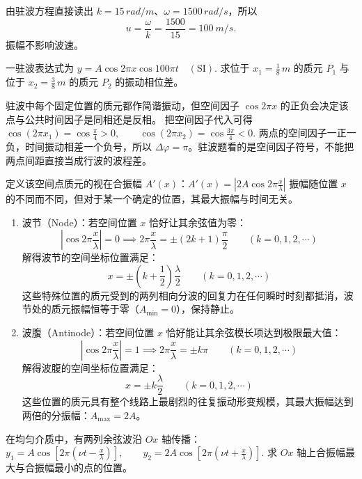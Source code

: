 \begin{solution}
由驻波方程直接读出 \(k=15\,\si{rad/m}\)、\(\omega=1500\,\si{rad/s}\)，所以
\[
u=\frac{\omega}{k}=\frac{1500}{15}=\SI{100}{m/s}.
\]
振幅不影响波速。
\end{solution}

\begin{exercise}
一驻波表达式为
 \(y=A\cos 2\pi x\cos 100\pi t\quad(\mathrm{SI}).\) 
求位于 \(x_1=\frac18\,\si{m}\) 的质元 \(P_1\) 与位于 \(x_2=\frac38\,\si{m}\) 的质元 \(P_2\) 的振动相位差。
\end{exercise}

\begin{solution}
驻波中每个固定位置的质元都作简谐振动，但空间因子 \(\cos 2\pi x\) 的正负会决定该点与公共时间因子是同相还是反相。
把空间因子代入可得
 \(\cos(2\pi x_1)=\cos\frac{\pi}{4}>0,\qquad \cos(2\pi x_2)=\cos\frac{3\pi}{4}<0.\) 
两点的空间因子一正一负，时间振动相差一个负号，所以 \(\Delta\varphi=\pi\)。驻波题看的是空间因子符号，不能把两点间距直接当成行波的波程差。
\end{solution}

\begin{definition}[波节，波腹]
定义该空间点质元的视在合振幅 $A'(x)$：$A'(x) = \left| 2A \cos 2\pi \frac{x}{\lambda} \right|$
振幅随位置 $x$ 的不同而不同，但对于某一个确定的位置，其最大振幅与时间无关。
\begin{enumerate}
\item 波节（Node）：若空间位置 $x$ 恰好让其余弦值为零：$$\left| \cos 2\pi \frac{x}{\lambda} \right| = 0 \implies 2\pi \frac{x}{\lambda} = \pm (2k + 1)\frac{\pi}{2} \qquad (k = 0,1,2,\cdots)$$解得波节的空间坐标位置满足：$$\boxed{x = \pm \left( k + \frac{1}{2} \right) \frac{\lambda}{2} \qquad (k = 0,1,2,\cdots)}$$这些特殊位置的质元受到的两列相向分波的回复力在任何瞬时时刻都抵消，波节处的质元振幅恒等于零（$A_{\text{min}} = 0$），保持静止。
\item 波腹（Antinode）：若空间位置 $x$ 恰好能让其余弦模长项达到极限最大值：$$\left| \cos 2\pi \frac{x}{\lambda} \right| = 1 \implies 2\pi \frac{x}{\lambda} = \pm k\pi \qquad (k = 0,1,2,\cdots)$$解得波腹的空间坐标位置满足：$$\boxed{x = \pm k \frac{\lambda}{2} \qquad (k = 0,1,2,\cdots)}$$这些位置的质元具有整个线路上最剧烈的往复振动形变规模，其最大振幅达到两倍的分振幅：$A_{\text{max}} = 2A$。
\end{enumerate}
\end{definition}

\begin{exercise}
在均匀介质中，有两列余弦波沿 \(Ox\) 轴传播：
 \(y_1=A\cos\left[2\pi\left(\nu t-\frac{x}{\lambda}\right)\right], \qquad y_2=2A\cos\left[2\pi\left(\nu t+\frac{x}{\lambda}\right)\right].\) 
求 \(Ox\) 轴上合振幅最大与合振幅最小的点的位置。
\end{exercise}


